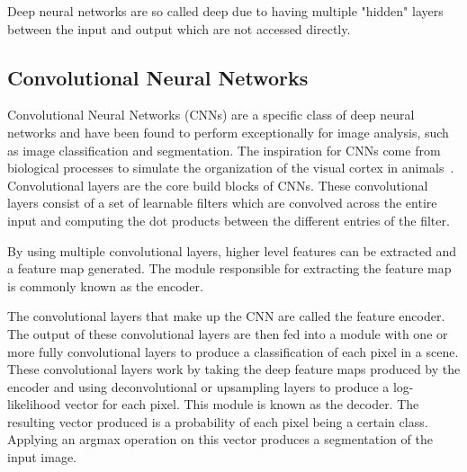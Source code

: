 Deep neural networks are so called deep due to having multiple "hidden" layers between the input and output which are not accessed directly.

\subsection{Convolutional Neural Networks}\label{section:background-cnn}
Convolutional Neural Networks (CNNs) are a specific class of deep neural networks and have been found to perform exceptionally for image analysis, such as image classification and segmentation.
The inspiration for CNNs come from biological processes to simulate the organization of the visual cortex in animals~\cite{cnnbiology}.
Convolutional layers are the core build blocks of CNNs.
These convolutional layers consist of a set of learnable filters which are convolved across the entire input and computing the dot products between the different entries of the filter.

By using multiple convolutional layers, higher level features can be extracted and a feature map generated.
The module responsible for extracting the feature map is commonly known as the encoder.

The convolutional layers that make up the CNN are called the feature encoder.
The output of these convolutional layers are then fed into a module with one or more fully convolutional layers to produce a classification of each pixel in a scene.
These convolutional layers work by taking the deep feature maps produced by the encoder and using deconvolutional or upsampling layers to produce a log-likelihood vector for each pixel.
This module is known as the decoder.
The resulting vector produced is a probability of each pixel being a certain class.
Applying an argmax operation on this vector produces a segmentation of the input image.
